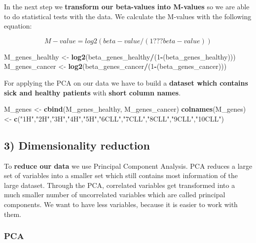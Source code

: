 \documentclass[]{article}
\newenvironment{Shaded}{\begin{snugshade}}{\end{snugshade}}
\newcommand{\KeywordTok}[1]{\textcolor[rgb]{0.13,0.29,0.53}{\textbf{#1}}}
\newcommand{\DecValTok}[1]{\textcolor[rgb]{0.00,0.00,0.81}{#1}}
\newcommand{\StringTok}[1]{\textcolor[rgb]{0.31,0.60,0.02}{#1}}
\newcommand{\OperatorTok}[1]{\textcolor[rgb]{0.81,0.36,0.00}{\textbf{#1}}}
\newcommand{\NormalTok}[1]{#1}
\begin{document}
In the next step we \textbf{transform our beta-values into M-values} so
we are able to do statistical tests with the data. We calculate the
M-values with the following equation:

\[M-value = log2(beta-value/(1??? beta-value))\]

\begin{Shaded}
\begin{Highlighting}[]
\NormalTok{M_genes_healthy <-}\StringTok{ }\KeywordTok{log2}\NormalTok{(beta_genes_healthy}\OperatorTok{/}\NormalTok{(}\DecValTok{1}\OperatorTok{-}\NormalTok{(beta_genes_healthy)))}
\NormalTok{M_genes_cancer <-}\StringTok{ }\KeywordTok{log2}\NormalTok{(beta_genes_cancer}\OperatorTok{/}\NormalTok{(}\DecValTok{1}\OperatorTok{-}\NormalTok{(beta_genes_cancer)))}
\end{Highlighting}
\end{Shaded}

For applying the PCA on our data we have to build a \textbf{dataset
which contains sick and healthy patients} with \textbf{short column
names}.

\begin{Shaded}
\begin{Highlighting}[]
\NormalTok{M_genes <-}\StringTok{ }\KeywordTok{cbind}\NormalTok{(M_genes_healthy, M_genes_cancer)}
\KeywordTok{colnames}\NormalTok{(M_genes) <-}\StringTok{ }\KeywordTok{c}\NormalTok{(}\StringTok{"1H"}\NormalTok{,}\StringTok{"2H"}\NormalTok{,}\StringTok{"3H"}\NormalTok{,}\StringTok{"4H"}\NormalTok{,}\StringTok{"5H"}\NormalTok{,}\StringTok{"6CLL"}\NormalTok{,}\StringTok{"7CLL"}\NormalTok{,}\StringTok{"8CLL"}\NormalTok{,}\StringTok{"9CLL"}\NormalTok{,}\StringTok{"10CLL"}\NormalTok{)}
\end{Highlighting}
\end{Shaded}

\subsection{3) Dimensionality reduction}\label{dimensionality-reduction}

To \textbf{reduce our data} we use Principal Component Analysis. PCA
reduces a large set of variables into a smaller set which still contains
most information of the large dataset. Through the PCA, correlated
variables get transformed into a much smaller number of uncorrelated
variables which are called principal components. We want to have less
variables, because it is easier to work with them.

\subsubsection{PCA}\label{pca}
\end{document}
